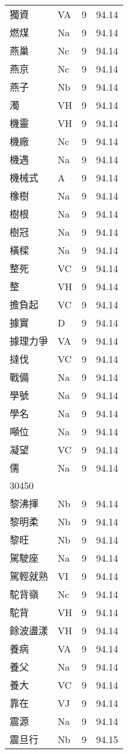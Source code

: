 \documentclass[twocolumn]{book}
\begin{document}
\begin{supertabular}{llrr}
獨資 & VA & 9 &  94.14\\
燃煤 & Na & 9 &  94.14\\
燕巢 & Nc & 9 &  94.14\\
燕京 & Nc & 9 &  94.14\\
燕子 & Nb & 9 &  94.14\\
濁 & VH & 9 &  94.14\\
機靈 & VH & 9 &  94.14\\
機廠 & Nc & 9 &  94.14\\
機遇 & Na & 9 &  94.14\\
機械式 & A & 9 &  94.14\\
橡樹 & Na & 9 &  94.14\\
樹根 & Na & 9 &  94.14\\
樹冠 & Na & 9 &  94.14\\
橫樑 & Na & 9 &  94.14\\
整死 & VC & 9 &  94.14\\
整 & VH & 9 &  94.14\\
擔負起 & VC & 9 &  94.14\\
據實 & D & 9 &  94.14\\
據理力爭 & VA & 9 &  94.14\\
撻伐 & VC & 9 &  94.14\\
戰備 & Na & 9 &  94.14\\
學號 & Na & 9 &  94.14\\
學名 & Na & 9 &  94.14\\
噸位 & Na & 9 &  94.14\\
凝望 & VC & 9 &  94.14\\
儒 & Na & 9 &  94.14\\
30450\\
黎沸揮 & Nb & 9 &  94.14\\
黎明柔 & Nb & 9 &  94.14\\
黎旺 & Nb & 9 &  94.14\\
駕駛座 & Na & 9 &  94.14\\
駕輕就熟 & VI & 9 &  94.14\\
駝背嶺 & Nc & 9 &  94.14\\
駝背 & VH & 9 &  94.14\\
餘波盪漾 & VH & 9 &  94.14\\
養病 & VA & 9 &  94.14\\
養父 & Na & 9 &  94.14\\
養大 & VC & 9 &  94.14\\
靠在 & VJ & 9 &  94.14\\
震源 & Na & 9 &  94.14\\
震旦行 & Nb & 9 &  94.15\\

\end{supertabular}
\end{document}
